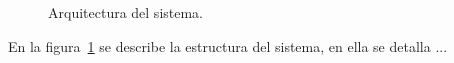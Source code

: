 \begin{figure}[htbp!]
	\begin{center}
		\caption{Arquitectura del sistema.}
		\label{fig:arquitectura}
	\end{center}
\end{figure}

En la figura~\ref{fig:arquitectura} se describe la estructura del sistema, en ella se detalla ...


